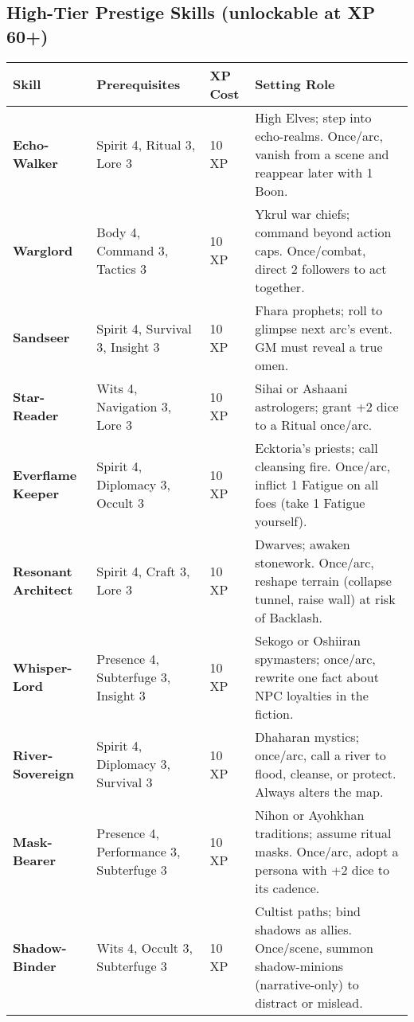 \documentclass[12pt]{book}
\begin{document}
\subsection*{High-Tier Prestige Skills (unlockable at XP 60+)}

\begin{tabular}{@{}llll@{}}
\toprule
\textbf{Skill} & \textbf{Prerequisites} & \textbf{XP Cost} & \textbf{Setting Role} \\
\midrule
\textbf{Echo-Walker} & Spirit 4, Ritual 3, Lore 3 & 10 XP & High Elves; step into echo-realms. Once/arc, vanish from a scene and reappear later with 1 Boon. \\
\textbf{Warglord} & Body 4, Command 3, Tactics 3 & 10 XP & Ykrul war chiefs; command beyond action caps. Once/combat, direct 2 followers to act together. \\
\textbf{Sandseer} & Spirit 4, Survival 3, Insight 3 & 10 XP & Fhara prophets; roll to glimpse next arc’s event. GM must reveal a true omen. \\
\textbf{Star-Reader} & Wits 4, Navigation 3, Lore 3 & 10 XP & Sihai or Ashaani astrologers; grant +2 dice to a Ritual once/arc. \\
\textbf{Everflame Keeper} & Spirit 4, Diplomacy 3, Occult 3 & 10 XP & Ecktoria’s priests; call cleansing fire. Once/arc, inflict 1 Fatigue on all foes (take 1 Fatigue yourself). \\
\textbf{Resonant Architect} & Spirit 4, Craft 3, Lore 3 & 10 XP & Dwarves; awaken stonework. Once/arc, reshape terrain (collapse tunnel, raise wall) at risk of Backlash. \\
\textbf{Whisper-Lord} & Presence 4, Subterfuge 3, Insight 3 & 10 XP & Sekogo or Oshiiran spymasters; once/arc, rewrite one fact about NPC loyalties in the fiction. \\
\textbf{River-Sovereign} & Spirit 4, Diplomacy 3, Survival 3 & 10 XP & Dhaharan mystics; once/arc, call a river to flood, cleanse, or protect. Always alters the map. \\
\textbf{Mask-Bearer} & Presence 4, Performance 3, Subterfuge 3 & 10 XP & Nihon or Ayohkhan traditions; assume ritual masks. Once/arc, adopt a persona with +2 dice to its cadence. \\
\textbf{Shadow-Binder} & Wits 4, Occult 3, Subterfuge 3 & 10 XP & Cultist paths; bind shadows as allies. Once/scene, summon shadow-minions (narrative-only) to distract or mislead. \\
\bottomrule
\end{tabular}
\end{document}
